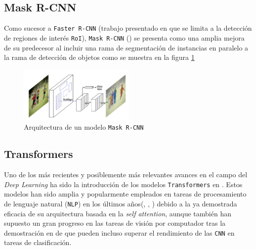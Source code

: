 \documentclass[12pt,a4paper]{report}
\begin{document}
\subsection{Mask R-CNN}
\label{subsec:maskrcnn}
Como sucesor a \texttt{Faster R-CNN} (trabajo presentado en \cite{girshick2015fastrcnn} que se limita a la detección de regiones de interés \texttt{RoI}), \texttt{Mask R-CNN} (\cite{he2018maskrcnn}) se presenta como una amplia mejora de su predecesor al incluir una rama de segmentación de instancias en paralelo a la rama de detección de objetos como se muestra en la figura \ref{fig:mask-rcnn-architecture}

\begin{figure}[!h]
    \centering
    \includegraphics[width=0.5\textwidth]{media/model/mask_rcnn.png}
    \caption{Arquitectura de un modelo \texttt{Mask R-CNN}}
    \label{fig:mask-rcnn-architecture}
\end{figure}

\subsection{Transformers}
\label{subsec:transformers}
Uno de los más recientes y posiblemente más relevantes avances en el campo del \textit{Deep Learning} ha sido la introducción de los modelos \texttt{Transformers} en \cite{vaswani2023attentionneed}. Estos modelos han sido amplia y popularmente empleados en tareas de procesamiento de lenguaje natural (\texttt{NLP}) en los últimos años(\cite{radford2018improving}, \cite{devlin2019bertpretrainingdeepbidirectional}, \cite{raffel2023exploringlimitstransferlearning}) debido a la ya demostrada eficacia de su arquitectura basada en la \textit{self attention}, aunque también han supuesto un gran progreso en las tareas de visión por computador tras la demostración en \cite{dosovitskiy2021imageworth16x16words} de que pueden incluso superar el rendimiento de las \texttt{CNN} en tareas de clasificación.

\end{document}
